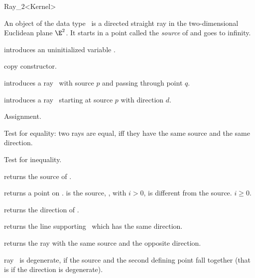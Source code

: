 \begin{ccRefClass}{Ray_2<Kernel>}

\ccDefinition
An object  of the data type \ccRefName\ is a directed
straight ray in the two-dimensional Euclidean plane $\E^2$. It starts
in a  point called the {\em source} of   and goes to infinity.

\ccCreation
{}


\ccHidden {}
             {introduces an uninitialized variable \ccVar.}

\ccHidden {}
 	    {copy constructor.}

            {introduces a ray \ccVar\ 
             with source $p$ and passing through point $q$.}

            {introduces a ray \ccVar\ starting at source $p$ with 
             direction $d$.}

\ccOperations

\ccHidden {}
        {Assignment.}

       {Test for equality: two rays are equal, iff they have the same 
        source and the same direction.}

       {Test for inequality.}

       {returns the source of \ccVar.}

       {returns a point on \ccVar.  is the source,
        \ccStyle{point(i)}, with $i>0$, is different from the 
        source. \ccPrecond $i \geq 0$.}

       {returns the direction of \ccVar.}

       {returns the line supporting \ccVar\ which has the same direction.}

       {returns the ray with the same source and the opposite direction.}

\ccPredicates

       {ray \ccVar\ is degenerate, if the source and the second defining
        point fall together (that is if the direction is degenerate).}


\end{ccRefClass}

